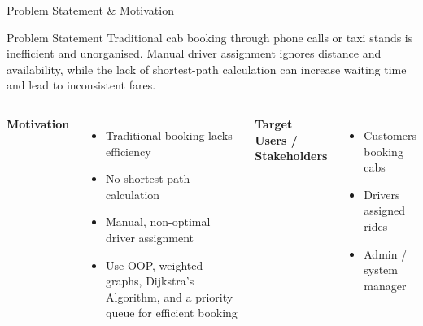 \documentclass[aspectratio=169,11pt]{beamer}
\begin{document}
\begin{frame}{Problem Statement \& Motivation}

\vspace{-6mm}

\begin{block}{Problem Statement}
\small
Traditional cab booking through phone calls or taxi stands is inefficient and unorganised. Manual driver assignment ignores distance and availability, while the lack of shortest-path calculation can increase waiting time and lead to inconsistent fares.
\end{block}

\vspace{1mm}

\begin{columns}[T,totalwidth=\textwidth]

\textbf{\color{GEUBlue}Motivation}
\begin{itemize}\itemsep1.5pt
\item Traditional booking lacks efficiency
\item No shortest-path calculation
\item Manual, non-optimal driver assignment
\item Use OOP, weighted graphs, Dijkstra's Algorithm, and a priority queue for efficient booking
\end{itemize}

\textbf{\color{GEUBlue}Target Users / Stakeholders}
\begin{itemize}\itemsep1.5pt
\item Customers booking cabs
\item Drivers assigned rides
\item Admin / system manager
\end{itemize}

\end{columns}

\end{frame}
\end{document}
